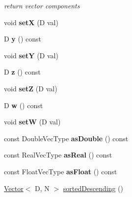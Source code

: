 \begin{DoxyCompactItemize}
\begin{DoxyCompactList}\small\item\em return vector components \end{DoxyCompactList}\item 
\mbox{\label{classrev_1_1_vector_a55adade626f3ca052c5ec3b771eaa68d}} 
void {\bfseries setX} (D val)
\item 
\mbox{\label{classrev_1_1_vector_ae9e047b892514210f3b1776ca5f65615}} 
D {\bfseries y} () const
\item 
\mbox{\label{classrev_1_1_vector_ab684ebad1a8ede3d8d737f943bbb16f1}} 
void {\bfseries setY} (D val)
\item 
\mbox{\label{classrev_1_1_vector_a7d41e145434cda472ea2dbc92d2838e6}} 
D {\bfseries z} () const
\item 
\mbox{\label{classrev_1_1_vector_a4e13a62fe95ce2618a8f9a166f3809f2}} 
void {\bfseries setZ} (D val)
\item 
\mbox{\label{classrev_1_1_vector_a630dcb58f9c40ad5bd3f5079b45c5da7}} 
D {\bfseries w} () const
\item 
\mbox{\label{classrev_1_1_vector_a4a31eac3eb24a409256cd271268b0dd0}} 
void {\bfseries setW} (D val)
\item 
\mbox{\label{classrev_1_1_vector_a26007f420dbab51180266489de167f2e}} 
const Double\+Vec\+Type {\bfseries as\+Double} () const
\item 
\mbox{\label{classrev_1_1_vector_ad8d2c325a27f924dfaeb9b4ccffe22d5}} 
const Real\+Vec\+Type {\bfseries as\+Real} () const
\item 
\mbox{\label{classrev_1_1_vector_aee495d2107e0e3002f60a2aa7db88516}} 
const Float\+Vec\+Type {\bfseries as\+Float} () const
\item 
\mbox{\label{classrev_1_1_vector_a50901a55d4f7ce59c946910557f35f78}} 
\mbox{\hyperlink{classrev_1_1_vector}{Vector}}$<$ D, N $>$ \mbox{\hyperlink{classrev_1_1_vector_a50901a55d4f7ce59c946910557f35f78}{sorted\+Descending}} ()

\end{DoxyCompactItemize}
